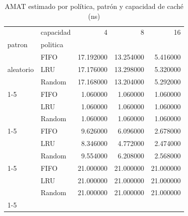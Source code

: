 \begin{table}
\caption{AMAT estimado por política, patrón y capacidad de caché (ns)}
\label{tab:amat}
\begin{tabular}{llrrr}
\toprule
 & capacidad & 4 & 8 & 16 \\
patron & politica &  &  &  \\
\midrule
\multirow[t]{3}{*}{aleatorio} & FIFO & 17.192000 & 13.254000 & 5.416000 \\
 & LRU & 17.176000 & 13.298000 & 5.320000 \\
 & Random & 17.168000 & 13.204000 & 5.292000 \\
\cline{1-5}
\multirow[t]{3}{*}{localidad} & FIFO & 1.060000 & 1.060000 & 1.060000 \\
 & LRU & 1.060000 & 1.060000 & 1.060000 \\
 & Random & 1.060000 & 1.060000 & 1.060000 \\
\cline{1-5}
\multirow[t]{3}{*}{mixto} & FIFO & 9.626000 & 6.096000 & 2.678000 \\
 & LRU & 8.346000 & 4.772000 & 2.474000 \\
 & Random & 9.554000 & 6.208000 & 2.568000 \\
\cline{1-5}
\multirow[t]{3}{*}{secuencial} & FIFO & 21.000000 & 21.000000 & 21.000000 \\
 & LRU & 21.000000 & 21.000000 & 21.000000 \\
 & Random & 21.000000 & 21.000000 & 21.000000 \\
\cline{1-5}
\bottomrule
\end{tabular}
\end{table}

